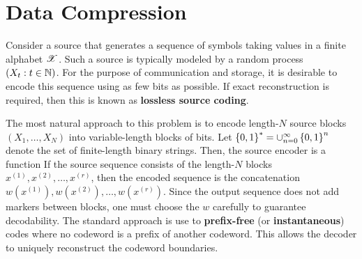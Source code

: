 \documentclass[letterpaper,10pt,english]{article}
\begin{document}
\section{ Data Compression}
Consider a source that generates a sequence of symbols taking values in a finite alphabet $\mathscr{X}$.  
Such a source is typically modeled by a random process $(X_t: t \in \mathbb{N})$. 
For the purpose of communication and storage, 
it is desirable to encode this sequence using as few bits as possible. 
If exact reconstruction is required, then this is known as \textbf{lossless source coding}.  

The most natural approach to this problem is to encode length-$N$ source blocks 
$(X_1, \dots , X_N)$ into variable-length blocks of bits. 
Let $\left\{0, 1\right\}^{\ast} = \cup_{n=0}^{\infty}\left\{0, 1\right\}^n$ denote the set of finite-length binary strings. Then, the source encoder is a function 
If the source sequence consists of the length-$N$ blocks $x^{(1)},x^{(2)}, \dots,x^{(r)}$, 
then the encoded sequence is the concatenation $w(x^{(1)}), w(x^{(2)}), \dots, w(x^{(r)})$. 
Since the output sequence does not add markers between blocks, one must choose the $w$ carefully to guarantee decodability. The standard approach is use to \textbf{prefix-free} (or \textbf{instantaneous}) codes where no codeword is a prefix of another codeword. 
This allows the decoder to uniquely reconstruct the codeword boundaries. 
\end{document}
